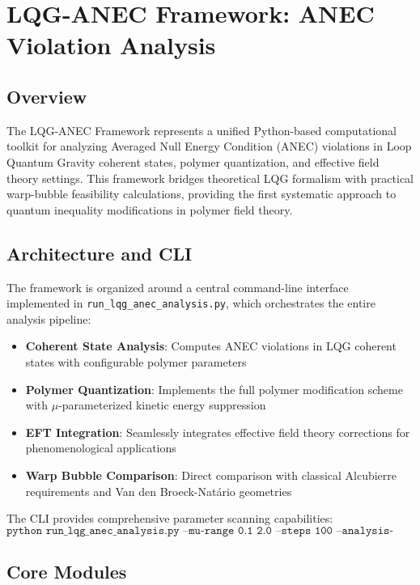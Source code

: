 \documentclass[11pt]{article}
\begin{document}
\section*{LQG-ANEC Framework: ANEC Violation Analysis}
\label{sec:lqg-anec-framework}

\subsection*{Overview}
The LQG-ANEC Framework represents a unified Python-based computational toolkit for analyzing Averaged Null Energy Condition (ANEC) violations in Loop Quantum Gravity coherent states, polymer quantization, and effective field theory settings. This framework bridges theoretical LQG formalism with practical warp-bubble feasibility calculations, providing the first systematic approach to quantum inequality modifications in polymer field theory.

\subsection{Architecture and CLI}

The framework is organized around a central command-line interface implemented in \texttt{run\_lqg\_anec\_analysis.py}, which orchestrates the entire analysis pipeline:

\begin{itemize}
\item \textbf{Coherent State Analysis}: Computes ANEC violations in LQG coherent states with configurable polymer parameters
\item \textbf{Polymer Quantization}: Implements the full polymer modification scheme with $\mu$-parameterized kinetic energy suppression
\item \textbf{EFT Integration}: Seamlessly integrates effective field theory corrections for phenomenological applications
\item \textbf{Warp Bubble Comparison}: Direct comparison with classical Alcubierre requirements and Van den Broeck-Natário geometries
\end{itemize}

The CLI provides comprehensive parameter scanning capabilities:
\[
\texttt{python run\_lqg\_anec\_analysis.py --mu-range 0.1 2.0 --steps 100 --analysis-type full}
\]

\subsection{Core Modules}
\end{document}
